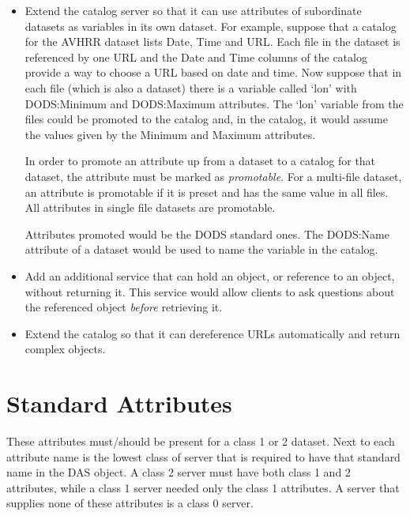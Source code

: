 \documentclass[12pt]{article}
\begin{document}
\begin{itemize}
  
\item Extend the catalog server so that it can use attributes of subordinate
  datasets as variables in its own dataset.  For example, suppose that a
  catalog for the AVHRR dataset lists Date, Time and URL. Each file in the
  dataset is referenced by one URL and the Date and Time columns of the
  catalog provide a way to choose a URL based on date and time. Now suppose
  that in each file (which is also a dataset) there is a variable called
  `lon' with DODS:Minimum and DODS:Maximum attributes. The `lon' variable
  from the files could be promoted to the catalog and, in the catalog, it
  would assume the values given by the Minimum and Maximum attributes.
  
  In order to promote an attribute up from a dataset to a catalog for that
  dataset, the attribute must be marked as \emph{promotable}. For a
  multi-file dataset, an attribute is promotable if it is preset and has the
  same value in all files. All attributes in single file datasets are
  promotable.
  
  Attributes promoted would be the DODS standard ones. The DODS:Name
  attribute of a dataset would be used to name the variable in the catalog.

\item Add an additional service that can hold an object, or reference to an
  object, without returning it. This service would allow clients to ask
  questions about the referenced object \emph{before} retrieving it.

\item Extend the catalog so that it can dereference URLs automatically and
  return complex objects.

\end{itemize}

\clearpage

\appendix

\section{Standard Attributes}
\label{app:standard}

These attributes must/should be present for a class 1 or 2 dataset. Next to
each attribute name is the lowest class of server that is required to have
that standard name in the DAS object. A class 2 server must have both class 1
and 2 attributes, while a class 1 server needed only the class 1 attributes.
A server that supplies none of these attributes is a class 0 server.
\end{document}
